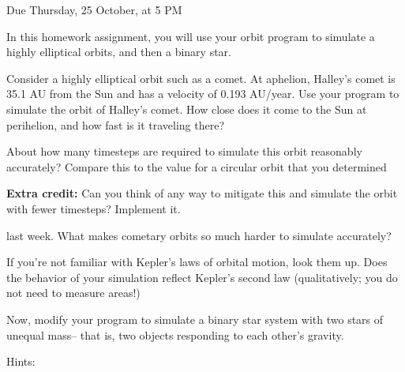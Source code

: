 \documentclass[12pt]{article}
\begin{document}
\Large
\centerline{}
\centerline{Due Thursday, 25 October, at 5 PM}
\normalsize

In this homework assignment, you will use your orbit program to simulate
a highly elliptical orbits, and then a binary star.

\begin{enumerate}

  \item{Consider a highly elliptical orbit such as a comet. At aphelion, Halley's comet is 35.1 AU from the Sun and has a velocity of 0.193 AU/year.
    Use your program to simulate the orbit of Halley's comet. How close does it come to the Sun at perihelion, and how fast is it traveling there? 
    
    About how many timesteps are required to simulate this orbit reasonably accurately? Compare this to the value for a circular orbit that you determined

\item{{\bf Extra credit:} Can you think of any way to mitigate this and simulate the orbit with fewer timesteps? Implement it.}

  last week. What makes cometary orbits so much harder to simulate accurately?}

\item If you're not familiar with Kepler's laws of orbital motion, look them up. Does the
behavior of your simulation reflect Kepler's second law (qualitatively; you do not need
to measure areas!)
  
\item{Now, modify your program to simulate a binary star system with two stars
of unequal mass-- that is, two objects
responding to each other's gravity. 

    Hints:

}
\end{enumerate}
\end{document}
